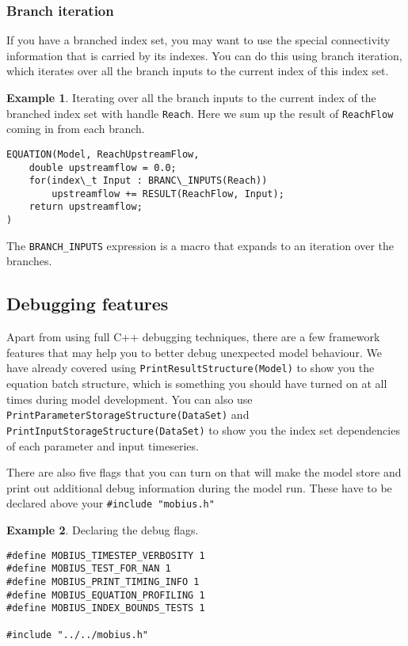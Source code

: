 \documentclass[11pt]{article}
\theoremstyle{definition}
\newtheorem{myexample}{Example}
\newenvironment{example}%
  {\begin{lrbox}{\examplebox}%
   \begin{minipage}{\dimexpr\linewidth-2\fboxsep}
   \begin{myexample}}%
  {\end{myexample}%
   \end{minipage}%
   \end{lrbox}%
   \begin{trivlist}
     \item[]\colorbox{silver}{\usebox\examplebox}
   \end{trivlist}}
\begin{document}
\subsubsection{Branch iteration}

If you have a branched index set, you may want to use the special connectivity information that is carried by its indexes. You can do this using branch iteration, which iterates over all the branch inputs to the current index of this index set.

\begin{example}
Iterating over all the branch inputs to the current index of the branched index set with handle {\tt Reach}. Here we sum up the result of {\tt ReachFlow} coming in from each branch.
\begin{lstlisting}[style=mycpp]
EQUATION(Model, ReachUpstreamFlow,
	double upstreamflow = 0.0;
	for(index\_t Input : BRANC\_INPUTS(Reach))
		upstreamflow += RESULT(ReachFlow, Input);
	return upstreamflow;
)
\end{lstlisting}
\end{example}

The {\tt BRANCH\_INPUTS} expression is a macro that expands to an iteration over the branches.

\subsection{Debugging features}

Apart from using full C++ debugging techniques, there are a few framework features that may help you to better debug unexpected model behaviour. We have already covered using {\tt PrintResultStructure(Model)} to show you the equation batch structure, which is something you should have turned on at all times during model development. You can also use {\tt PrintParameterStorageStructure(DataSet)} and {\tt PrintInputStorageStructure(DataSet)} to show you the index set dependencies of each parameter and input timeseries.

There are also five flags that you can turn on that will make the model store and print out additional debug information during the model run. These have to be declared above your {\tt \#include "mobius.h"}

\begin{example}
Declaring the debug flags.
\begin{lstlisting}[style=mycpp]
#define MOBIUS_TIMESTEP_VERBOSITY 1
#define MOBIUS_TEST_FOR_NAN 1
#define MOBIUS_PRINT_TIMING_INFO 1
#define MOBIUS_EQUATION_PROFILING 1
#define MOBIUS_INDEX_BOUNDS_TESTS 1

#include "../../mobius.h"
\end{lstlisting}
\end{example}
\end{document}
